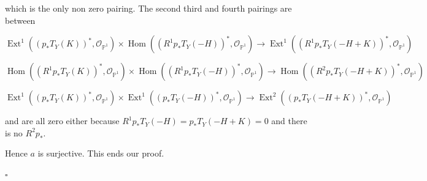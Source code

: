 \documentclass[11pt,twoside]{amsart}
\theoremstyle{plain}
\numberwithin{equation}{section}
\theoremstyle{definition}
\newcommand*{\QEDB}{\hfill\ensuremath{\square}}
\begin{document}
 which is the only non zero pairing. The second third and fourth pairings are between


$$\operatorname{Ext}^1((p_*T_Y(K))^*,\mathcal{O}_{\mathbb{P}^1}) \times \operatorname{Hom}((R^1p_*T_Y(-H))^*,\mathcal{O}_{\mathbb{P}^1}) \to \operatorname{Ext}^1((R^1p_*T_Y(-H+K))^*,\mathcal{O}_{\mathbb{P}^1}) $$

$$\operatorname{Hom}((R^1p_*T_Y(K))^*,\mathcal{O}_{\mathbb{P}^1}) \times \operatorname{Hom}((R^1p_*T_Y(-H))^*,\mathcal{O}_{\mathbb{P}^1}) \to \operatorname{Hom}((R^2p_*T_Y(-H+K))^*,\mathcal{O}_{\mathbb{P}^1}) $$

$$\operatorname{Ext}^1((p_*T_Y(K))^*,\mathcal{O}_{\mathbb{P}^1}) \times \operatorname{Ext}^1((p_*T_Y(-H))^*,\mathcal{O}_{\mathbb{P}^1}) \to \operatorname{Ext}^2((p_*T_Y(-H+K))^*,\mathcal{O}_{\mathbb{P}^1}) $$

and are all zero either because $R^1p_*T_Y(-H) = p_*T_Y(-H+K) = 0$ and there is no $R^2p_*$.






\color{black}

Hence $a$ is surjective. This ends our proof.


\QEDB
\end{document}
